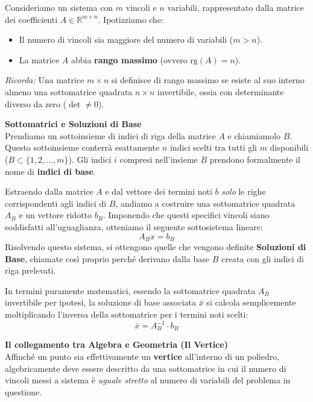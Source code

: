 \documentclass[12pt, a4paper]{article}
\begin{document}
	Consideriamo un sistema con $m$ vincoli e $n$ variabili, rappresentato dalla matrice dei coefficienti $A \in \mathbb{R}^{m \times n}$. Ipotizziamo che:
	\begin{itemize}[label=\textcolor{titlecolor}{\Large\textbullet}, itemsep=4pt, parsep=2pt, leftmargin=1.5cm]
		\item Il numero di vincoli sia maggiore del numero di variabili ($m > n$).
		\item La matrice $A$ abbia \textbf{rango massimo} (ovvero $\text{rg}(A) = n$). 
	\end{itemize}
	\textit{Ricorda:} Una matrice $m \times n$ si definisce di rango massimo se esiste al suo interno almeno una sottomatrice quadrata $n \times n$ invertibile, ossia con determinante diverso da zero ($\det \neq 0$).
	
	\vspace{0.4cm}
	\textbf{Sottomatrici e Soluzioni di Base}\\
	Prendiamo un sottoinsieme di indici di riga della matrice $A$ e chiamiamolo $B$. Questo sottoinsieme conterrà esattamente $n$ indici scelti tra tutti gli $m$ disponibili ($B \subset \{1, 2, \dots, m\}$). Gli indici $i$ compresi nell'insieme $B$ prendono formalmente il nome di \textbf{indici di base}.
	
	Estraendo dalla matrice $A$ e dal vettore dei termini noti $b$ \textit{solo} le righe corrispondenti agli indici di $B$, andiamo a costruire una sottomatrice quadrata $A_B$ e un vettore ridotto $b_B$. Imponendo che questi specifici vincoli siano soddisfatti all'uguaglianza, otteniamo il seguente sottosistema lineare:
	\[
	A_B x = b_B
	\]
	Risolvendo questo sistema, si ottengono quelle che vengono definite \textbf{Soluzioni di Base}, chiamate così proprio perché derivano dalla base $B$ creata con gli indici di riga prelevati. 
	
	In termini puramente matematici, essendo la sottomatrice quadrata $A_B$ invertibile per ipotesi, la soluzione di base associata $\bar{x}$ si calcola semplicemente moltiplicando l'inversa della sottomatrice per i termini noti scelti:
	\[
	\bar{x} = A_B^{-1} \cdot b_B
	\]
	
	\vspace{0.4cm}
	\textbf{Il collegamento tra Algebra e Geometria (Il Vertice)}\\
	Affinché un punto sia effettivamente un \textbf{vertice} all'interno di un poliedro, algebricamente deve essere descritto da una sottomatrice in cui il numero di vincoli messi a sistema è \textit{uguale stretto} al numero di variabili del problema in questione.
	
\end{document}
